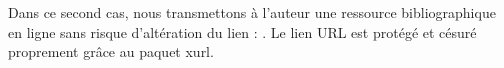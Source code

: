 Dans ce second cas, nous transmettons à l'auteur une ressource bibliographique en ligne sans risque d'altération du lien : .
Le lien URL est protégé et césuré proprement grâce au paquet \textsf{xurl}.


